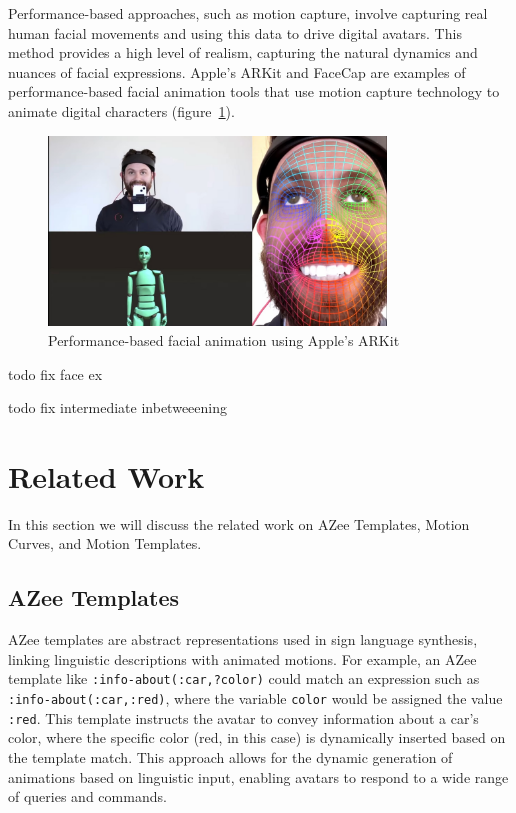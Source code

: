 \documentclass[../../main.tex]{subfiles}
\begin{document}
Performance-based approaches, such as motion capture, involve capturing real human facial movements and using this data to drive digital avatars. This method provides a high level of realism, capturing the natural dynamics and nuances of facial expressions. Apple's ARKit and FaceCap are examples of performance-based facial animation tools that use motion capture technology to animate digital characters (figure~\ref{ch:facial_expressions:fig:motion_capture}).

\begin{figure}
    \centering
    \includegraphics[width=0.8\textwidth]{chapters/facial_expressions/images/motion_capture.jpg}
    \caption{Performance-based facial animation using Apple's ARKit}
    \label{ch:facial_expressions:fig:motion_capture}
\end{figure}

todo fix face ex

todo fix intermediate inbetweeening


\section{Related Work}
\label{ch:intermediate_blocks_pose_correction:related_work}

In this section we will discuss the related work on AZee Templates, Motion Curves, and Motion Templates. 

\subsection{AZee Templates}
\label{ch:intermediate_blocks_pose_correction:related_work:azee_templates}

AZee templates are abstract representations used in sign language synthesis, linking linguistic descriptions with animated motions. For example, an AZee template like \texttt{:info-about(:car,?color)} could match an expression such as \texttt{:info-about(:car,:red)}, where the variable \texttt{color} would be assigned the value \texttt{:red}. This template instructs the avatar to convey information about a car's color, where the specific color (red, in this case) is dynamically inserted based on the template match. This approach allows for the dynamic generation of animations based on linguistic input, enabling avatars to respond to a wide range of queries and commands.
\end{document}
